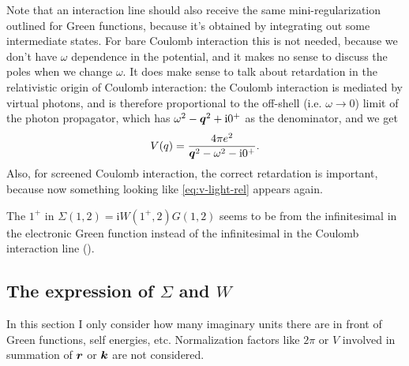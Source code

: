 \documentclass[hyperref, a4paper, 12pt]{report}
\newcommand*{\ii}{\mathrm{i}}
\begin{document}
Note that an interaction line should also receive the same mini-regularization 
outlined for Green functions, 
because it's obtained by integrating out some intermediate states. 
For bare Coulomb interaction this is not needed,
because we don't have $\omega$ dependence in the potential,
and it makes no sense to discuss the poles when we change $\omega$.
It does make sense to talk about retardation 
in the relativistic origin of Coulomb interaction:
the Coulomb interaction is mediated by virtual photons,
and is therefore proportional to the off-shell (i.e. $\omega \to 0$) limit of 
the photon propagator, 
which has $\omega^2 - \vb*{q}^2 + \ii 0^+$ 
as the denominator, and we get 
\begin{equation}
    V(q) = \frac{4\pi e^2}{\vb*{q}^2 - \omega^2 - \ii 0^+}.
    \label{eq:v-light-rel}
\end{equation}
Also, for screened Coulomb interaction, 
the correct retardation is important,
because now something looking like \eqref{eq:v-light-rel} appears again.

The $1^+$ in $\Sigma(1, 2) = \ii W(1^+, 2) G(1, 2)$ 
seems to be from the infinitesimal in the electronic Green function 
instead of the infinitesimal in the Coulomb interaction line
().

\subsection{The expression of $\Sigma$ and $W$}\label{sec:gw-bse.preliminaries.diagram.corrections}

In this section I only consider how many imaginary units there are in front of 
Green functions, self energies, etc.
Normalization factors like $2\pi$ or $V$ 
involved in summation of $\vb*{r}$ or $\vb*{k}$ are not considered.
\end{document}
